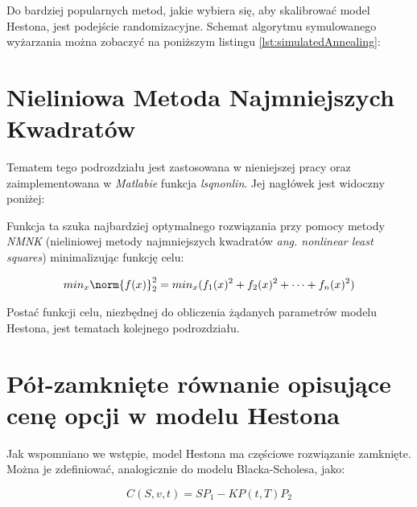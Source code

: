 \documentclass{pracamgr}
\begin{document}
Do bardziej popularnych metod, jakie wybiera się, aby skalibrować model Hestona, jest podejście randomizacyjne. Schemat algorytmu symulowanego wyżarzania można zobaczyć na poniższym listingu
\ref{lst:simulatedAnnealing}:



\section{Nieliniowa Metoda Najmniejszych Kwadratów}

Tematem tego podrozdziału jest zastosowana w nieniejszej pracy oraz zaimplementowana w \textit{Matlabie} funkcja \textit{lsqnonlin}. Jej nagłówek jest widoczny poniżej:


Funkcja ta szuka najbardziej optymalnego rozwiązania przy pomocy metody \textit{NMNK} (nieliniowej metody najmniejszych kwadratów \textit{ang. nonlinear least squares}) minimalizując funkcję celu:

\begin{equation}
  min_x \norm{f(x)}^2_2 = min_x(f_1(x)^2 + f_2(x)^2 + \cdots + f_n(x)^2)
\end{equation}

Postać funkcji celu, niezbędnej do obliczenia żądanych parametrów modelu Hestona, jest tematach kolejnego podrozdziału.

\section{Pół-zamknięte równanie opisujące cenę opcji w modelu Hestona}

Jak wspomniano we wstępie, model Hestona ma częściowe rozwiązanie zamknięte. Można je zdefiniować, analogicznie do modelu Blacka-Scholesa, jako:

\begin{equation}
  C(S, v, t) = SP_1 -K P(t,T) P_2
\end{equation}
\end{document}
